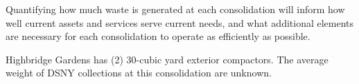 
    Quantifying how much waste is generated at each consolidation will inform how well current assets and services serve current needs, and what additional elements are necessary for each consolidation to operate as efficiently as possible.
    
    Highbridge Gardens has (2) 30-cubic yard exterior compactors. The average weight of DSNY collections at this consolidation are unknown.